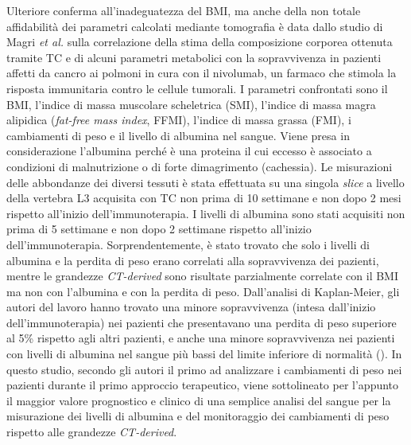Ulteriore conferma all'inadeguatezza del BMI, ma anche della non totale affidabilità dei parametri calcolati mediante tomografia è data dallo studio di Magri \textit{et al.} \cite{Magri2019} sulla correlazione della stima della composizione corporea ottenuta tramite TC e di alcuni parametri metabolici con la sopravvivenza in pazienti affetti da cancro ai polmoni in cura con il nivolumab, un farmaco che stimola la risposta immunitaria contro le cellule tumorali. I parametri confrontati sono il BMI, l’indice di massa muscolare scheletrica (SMI), l’indice di massa magra alipidica (\textit{fat-free mass index}, FFMI), l’indice di massa grassa (FMI), i cambiamenti di peso e il livello di albumina nel sangue. Viene presa in considerazione l’albumina perché è una proteina il cui eccesso è associato a condizioni di malnutrizione o di forte dimagrimento (cachessia). Le misurazioni delle abbondanze dei diversi tessuti è stata effettuata su una singola \textit{slice} a livello della vertebra L3 acquisita con TC non prima di 10 settimane e non dopo 2 mesi rispetto all'inizio dell'immunoterapia. I livelli di albumina sono stati acquisiti non prima di 5 settimane e non dopo 2 settimane rispetto all'inizio dell'immunoterapia. Sorprendentemente, è stato trovato che solo i livelli di albumina e la perdita di peso erano correlati alla sopravvivenza dei pazienti, mentre le grandezze \textit{CT-derived} sono risultate parzialmente correlate con il BMI ma non con l’albumina e con la perdita di peso. Dall'analisi di Kaplan-Meier, gli autori del lavoro hanno trovato una minore sopravvivenza (intesa dall'inizio dell'immunoterapia) nei pazienti che presentavano una perdita di peso superiore al 5\% rispetto agli altri pazienti, e anche una minore sopravvivenza nei pazienti con livelli di albumina nel sangue più bassi del limite inferiore di normalità (). In questo studio, secondo gli autori il primo ad analizzare i cambiamenti di peso nei pazienti durante il primo approccio terapeutico, viene sottolineato per l’appunto il maggior valore prognostico e clinico di una semplice analisi del sangue per la misurazione dei livelli di albumina e del monitoraggio dei cambiamenti di peso rispetto alle grandezze \textit{CT-derived}.
